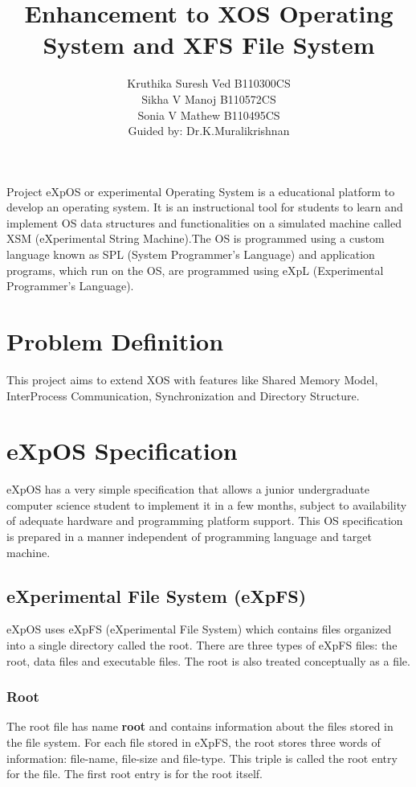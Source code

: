 \documentclass[11pt ,twosided]{article}
\title{Enhancement to XOS Operating System and XFS File System}
\author{ Kruthika Suresh Ved     B110300CS\\  Sikha V Manoj     B110572CS\\  Sonia V Mathew    B110495CS\\ Guided by: Dr.K.Muralikrishnan}
\begin{document}
\maketitle
	

\abstract{} 

Project eXpOS or experimental Operating System is a educational platform to develop an operating system. It is an instructional tool for students to learn and implement OS data structures and functionalities on a simulated machine called XSM (eXperimental String Machine).The OS is programmed using a custom language known as SPL (System Programmer's Language) and application programs, which run on the OS, are programmed using eXpL (Experimental Programmer's Language).


\section{Problem Definition}

This project aims to extend XOS with features like Shared Memory Model, Inter\-Process Communication, Synchronization and Directory Structure.
\section{eXpOS Specification}

eXpOS has a very simple specification that allows a junior undergraduate computer science student to implement it in a few months, subject to availability of adequate hardware and programming platform support. This OS specification is prepared in a manner independent of programming language and target machine.
\subsection{eXperimental File System (eXpFS)}

eXpOS uses eXpFS (eXperimental File System) which contains files organized into a single directory called the root. There are three types of eXpFS files: the root, data files and executable files. The root is also treated conceptually as a file.
\subsubsection{Root}

The root file has name \textbf {root} and contains information about the files stored in the file system. For each file stored in eXpFS, the root stores three words of information: file-name, file-size and file-type. This triple is called the root entry for the file. The first root entry is for the root itself.  
\end{document}
